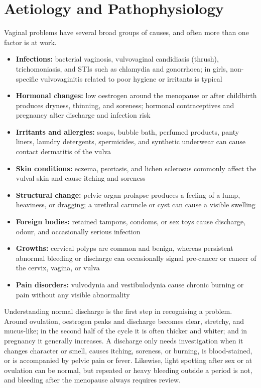 \section*{Aetiology and Pathophysiology}
Vaginal problems have several broad groups of causes, and often more than one factor is at work.

\begin{itemize}
    \item \textbf{Infections:} bacterial vaginosis, vulvovaginal candidiasis (thrush), trichomoniasis, and STIs such as chlamydia and gonorrhoea; in girls, non-specific vulvovaginitis related to poor hygiene or irritants is typical
    \item \textbf{Hormonal changes:} low oestrogen around the menopause or after childbirth produces dryness, thinning, and soreness; hormonal contraceptives and pregnancy alter discharge and infection risk
    \item \textbf{Irritants and allergies:} soaps, bubble bath, perfumed products, panty liners, laundry detergents, spermicides, and synthetic underwear can cause contact dermatitis of the vulva
    \item \textbf{Skin conditions:} eczema, psoriasis, and lichen sclerosus commonly affect the vulval skin and cause itching and soreness
    \item \textbf{Structural change:} pelvic organ prolapse produces a feeling of a lump, heaviness, or dragging; a urethral caruncle or cyst can cause a visible swelling
    \item \textbf{Foreign bodies:} retained tampons, condoms, or sex toys cause discharge, odour, and occasionally serious infection
    \item \textbf{Growths:} cervical polyps are common and benign, whereas persistent abnormal bleeding or discharge can occasionally signal pre-cancer or cancer of the cervix, vagina, or vulva
    \item \textbf{Pain disorders:} vulvodynia and vestibulodynia cause chronic burning or pain without any visible abnormality
\end{itemize}

Understanding normal discharge is the first step in recognising a problem. Around ovulation, oestrogen peaks and discharge becomes clear, stretchy, and mucus-like; in the second half of the cycle it is often thicker and whiter; and in pregnancy it generally increases. A discharge only needs investigation when it changes character or smell, causes itching, soreness, or burning, is blood-stained, or is accompanied by pelvic pain or fever. Likewise, light spotting after sex or at ovulation can be normal, but repeated or heavy bleeding outside a period is not, and bleeding after the menopause always requires review.

